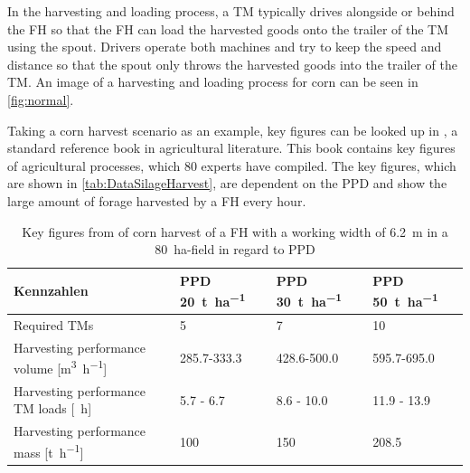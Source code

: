 \documentclass[]{nsm-thesis}
\begin{document}
In the harvesting and loading process, a \ac{TM} typically drives alongside or behind the \ac{FH} so that the \ac{FH} can load the harvested goods onto the trailer of the \ac{TM} using the spout. Drivers operate both machines and try to keep the speed and distance so that the spout only throws the harvested goods into the trailer of the TM. An image of a harvesting and loading process for corn can be seen in \autoref{fig:normal}.

Taking a corn harvest scenario as an example, key figures can be looked up in \cite{faustzahlen2018}, a standard reference book in agricultural literature. This book contains key figures of agricultural processes, which 80 experts have compiled. The key figures, which are shown in \autoref{tab:DataSilageHarvest}, are dependent on the \ac{PPD} and show the large amount of forage harvested by  a  \ac{FH} every hour.
\begin{table}
	\centering
	\begin{tabular}{>{\raggedright}p{5.5cm}p{1.6cm}p{1.6cm}p{1.6cm}}
		\toprule
		Kennzahlen & \ac{PPD} \SI{20}{\tonne\per\hectare} & \ac{PPD} \SI{30}{\tonne\per\hectare} & \ac{PPD} \SI{50}{\tonne\per\hectare}\\
		\midrule
		Required \ac{TM}s & \num{5}&
		\num{7} & \num{10} \\
		Harvesting performance volume [\si{\cubic\metre\per\hour}] &
		\num{285.7}-\num{333.3}
		& \num{428.6}-\num{500.0} &
		\num{595.7}-\num{695.0}\\
		Harvesting performance \ac{TM} loads [\si{\per\hour}] &
		\num{5.7} - \num{6.7}
		& \num{8.6} - \num{10.0} &
		\num{11.9} - \num{13.9}\\
		Harvesting performance mass [\si{\tonne\per\hour}] & \num{100}
		 & \num{150} &
		\num{208.5} \\
		\bottomrule
	\end{tabular}
	\caption{Key figures from \cite{faustzahlen2018} of corn harvest of a \ac{FH} with a working width of \SI{6.2}{\metre} in a \SI{80}{\hectare}-field in regard to \ac{PPD}}
	\label{tab:DataSilageHarvest}
\end{table}
\end{document}
